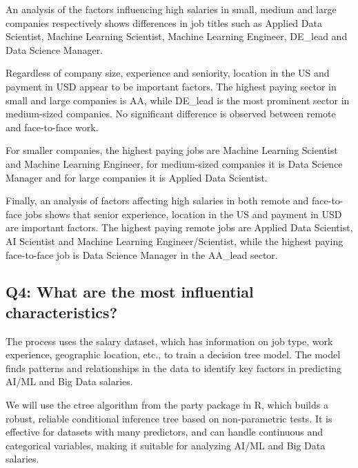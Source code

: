 \documentclass[
]{article}
\begin{document}
An analysis of the factors influencing high salaries in small, medium
and large companies respectively shows differences in job titles such as
Applied Data Scientist, Machine Learning Scientist, Machine Learning
Engineer, DE\_lead and Data Science Manager.

Regardless of company size, experience and seniority, location in the US
and payment in USD appear to be important factors. The highest paying
sector in small and large companies is AA, while DE\_lead is the most
prominent sector in medium-sized companies. No significant difference is
observed between remote and face-to-face work.

For smaller companies, the highest paying jobs are Machine Learning
Scientist and Machine Learning Engineer, for medium-sized companies it
is Data Science Manager and for large companies it is Applied Data
Scientist.

Finally, an analysis of factors affecting high salaries in both remote
and face-to-face jobs shows that senior experience, location in the US
and payment in USD are important factors. The highest paying remote jobs
are Applied Data Scientist, AI Scientist and Machine Learning
Engineer/Scientist, while the highest paying face-to-face job is Data
Science Manager in the AA\_lead sector.

\hypertarget{q4-what-are-the-most-influential-characteristics}{%
\subsection{Q4: What are the most influential
characteristics?}\label{q4-what-are-the-most-influential-characteristics}}

The process uses the salary dataset, which has information on job type,
work experience, geographic location, etc., to train a decision tree
model. The model finds patterns and relationships in the data to
identify key factors in predicting AI/ML and Big Data salaries.

\scriptsize

\normalsize

We will use the ctree algorithm from the party package in R, which
builds a robust, reliable conditional inference tree based on
non-parametric tests. It is effective for datasets with many predictors,
and can handle continuous and categorical variables, making it suitable
for analyzing AI/ML and Big Data salaries.

\scriptsize
\end{document}
